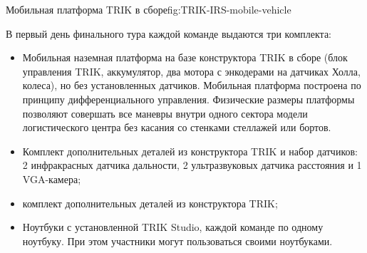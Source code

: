 {Мобильная платформа TRIK в сборе}{fig:TRIK-IRS-mobile-vehicle}

В первый день финального тура каждой команде выдаются три комплекта:
\begin{itemize}
    \item Мобильная наземная платформа на базе конструктора TRIK в сборе
    (блок управления TRIK, аккумулятор, два мотора с энкодерами на датчиках
    Холла, колеса), но без установленных датчиков.
    Мобильная платформа построена по принципу дифференциального управления.
    Физические размеры платформы позволяют совершать все маневры внутри одного сектора
    модели логистического центра без касания со стенками стеллажей или бортов.
    \item Комплект дополнительных деталей из конструктора TRIK и набор датчиков:
    2 инфракрасных датчика дальности, 2 ультразвуковых датчика расстояния и 1 VGA-камера;
    \item комплект дополнительных деталей из конструктора TRIK;
    \item Ноутбуки с установленной TRIK Studio, каждой команде по одному ноутбуку.
    При этом участники могут пользоваться своими ноутбуками.

\end{itemize}